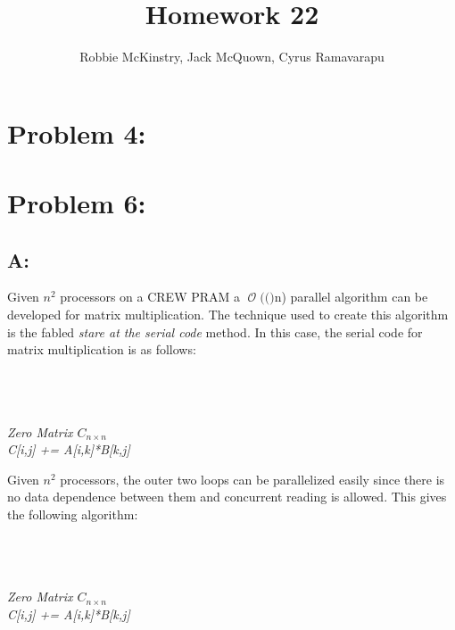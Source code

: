 \documentclass[12pt]{article}
\newcommand{\BigO}[1]{\ensuremath{\operatorname{\mathcal{O}}\bigl(#1\bigr)}}
\begin{document}
\title{Homework 22}
\author{Robbie McKinstry, Jack McQuown, Cyrus Ramavarapu}
\renewcommand{\today}{24 October 2016}
\renewcommand{\baselinestretch}{1.5}
\maketitle

\section*{Problem 4: }
\section*{Problem 6: }
\subsection*{A:}
Given $n^2$ processors on a CREW PRAM a \BigO(n) parallel algorithm
can be developed for matrix multiplication.  The technique used to 
create this algorithm is the fabled \textit{stare at the serial code}
method.  In this case, the serial code for matrix multiplication is as
follows:\\\\
\begin{algorithm}[H]
\\
\\
\textit{Zero Matrix $C_{n\times n}$}\\
{
{
{\textit{C[i,j] += A[i,k]*B[k,j]}}
}
}
\end{algorithm}
Given $n^2$ processors, the outer two loops can be parallelized easily
since there is no data dependence between them and concurrent reading
is allowed.  This gives the following algorithm:\\\\
\begin{algorithm}[H]
\\
\\
\textit{Zero Matrix $C_{n\times n}$}\\
{
{
{\textit{C[i,j] += A[i,k]*B[k,j]}}
}
}
\\
\end{algorithm}
\end{document}
